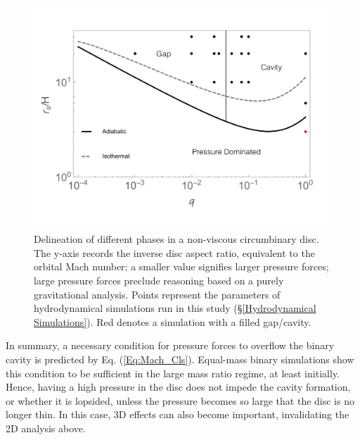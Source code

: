 \begin{figure}
\begin{center}
\includegraphics[scale=0.25]{figures/ch2/Gap_Closing_Mach_All.pdf} \vspace{-10 pt}
\end{center}
\caption{Delineation of different phases in a non-viscous circumbinary disc. The y-axis 
  records the inverse disc aspect ratio, equivalent to the orbital Mach number; a 
  smaller value signifies larger pressure forces; large pressure forces preclude 
  reasoning based on a purely gravitational analysis. Points
  represent the parameters of hydrodynamical simulations run in this study 
  (\S \ref{Hydrodynamical Simulations}). Red denotes a simulation with 
  a filled gap/cavity.}
\label{Fig:GapOpen}
\end{figure}

In summary, a necessary condition for pressure forces to overflow 
the binary cavity is predicted by Eq. (\ref{Eq:Mach_Cls}). Equal-mass binary 
simulations show this condition to be sufficient in the large 
mass ratio regime, at least initially. Hence, having a high pressure in 
the disc does not impede the cavity formation, or whether it is lopsided,
unless the pressure becomes so large that the disc is no longer thin. 
In this case, 3D effects can also become important, invalidating the 2D analysis above.

